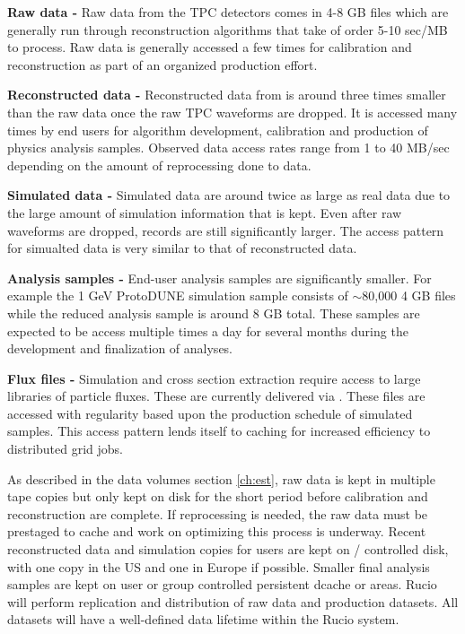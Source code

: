\documentclass[../main-v1.tex]{subfiles}
\begin{document}
\begin{description}
    \item{\bf Raw data -}  Raw data from the TPC detectors comes in 4-8 GB files which are generally run through reconstruction algorithms that take of order 5-10 sec/MB to process. Raw data is generally accessed a few times for calibration and reconstruction as part of an organized production effort.  
    \item{\bf Reconstructed data -}  Reconstructed data from  is around three times smaller  than the raw data once the raw TPC waveforms are dropped. It is accessed many times by end users for algorithm development, calibration and production of physics analysis samples.   Observed data access rates range from 1 to 40 MB/sec depending on the amount of reprocessing done to data. 
    \item{\bf Simulated data - } Simulated data are around twice as large as real data due to the large amount of simulation information that is kept.  Even after raw waveforms are dropped, records are still significantly larger. The access pattern for simualted data is very similar to that of reconstructed data.
    \item{\bf Analysis samples - } End-user analysis samples are significantly smaller.  For example the 1 GeV ProtoDUNE simulation sample consists of $\sim$80,000 4 GB files while the reduced analysis sample is around 8 GB total.  These samples are expected to be access multiple times a day for several months during the development and finalization of analyses.
    \item{\bf Flux files - } Simulation and cross section extraction require access to large libraries of particle fluxes.  These are currently delivered via . These files are accessed with regularity based upon the production schedule of simulated samples. This access pattern lends itself to caching for increased efficiency to distributed grid jobs.
    
\end{description}

As described in the data volumes section \ref{ch:est}, raw data is kept in multiple tape copies but only kept on disk for the short period before calibration and reconstruction are complete.  If reprocessing is needed, the raw data must be prestaged to cache and work on optimizing this process is underway. Recent reconstructed data and simulation copies for users are kept on / controlled disk, with one copy in the US and one in Europe if possible. Smaller final analysis samples are kept on user or group controlled persistent dcache or  areas. Rucio will perform replication and distribution of raw data and production datasets. 
 All datasets will have a well-defined data lifetime within the Rucio system. 
\end{document}
